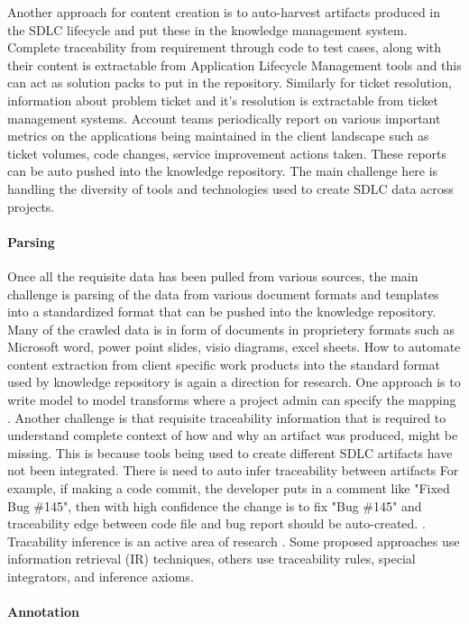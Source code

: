 Another approach for content creation is to auto-harvest artifacts produced in the SDLC lifecycle and put these in the knowledge management system. Complete traceability from requirement through code to test cases, along with their content is extractable from Application Lifecycle Management tools and this can act as solution packs to put in the repository. Similarly for ticket resolution, information about problem ticket and it's resolution is extractable from ticket management systems. Account teams periodically report on various important metrics on the applications being maintained in the client landscape such as ticket volumes, code changes, service improvement actions taken. These reports can be auto pushed into the knowledge repository. The main challenge here is handling the diversity of tools and technologies used to create SDLC data across projects. 

\paragraph*{Parsing} Once all the requisite data has been pulled from various sources, the main challenge is parsing of the data from various document formats and templates into a standardized format that can be pushed into the knowledge repository. Many of the crawled data is in form of documents in proprietery formats such as Microsoft word, power point slides, visio diagrams, excel sheets. How to automate content extraction from client specific work products into the standard format used by knowledge repository is again a direction for research. One approach is to write model to model transforms where a project admin can specify the mapping \cite{debdoot:2010:scc}. Another challenge is that requisite traceability information that is required to understand complete context of how and why an artifact was produced, might be missing. This is because tools being used to create different SDLC artifacts have not been integrated. There is need to auto infer traceability between artifacts
For example, if making a code commit, the developer puts in a comment like "Fixed Bug \#145", then with high confidence the change is to fix "Bug \#145" and traceability edge between code file and bug report should be auto-created. 
. Tracability inference is an active area of research \cite{spanoudakis2005software}. Some proposed approaches use information retrieval (IR) techniques, others use traceability rules, special integrators, and inference axioms.

\paragraph*{Annotation}

